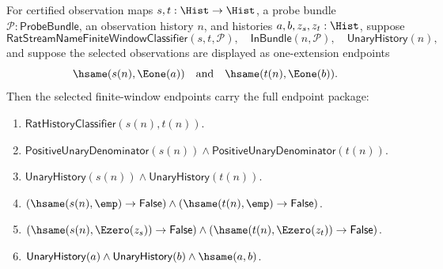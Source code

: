 \begin{theorem}
\label{thm:rat-stream-name-finite-window-selected-full-endpoint-package}
For certified observation maps $s,t:\Hist\to\Hist$, a probe bundle
$\mathcal{P}:\mathsf{ProbeBundle}$, an observation history $n$, and histories
$a,b,z_s,z_t:\Hist$, suppose
$$
\mathsf{RatStreamNameFiniteWindowClassifier}(s,t,\mathcal{P}),
\quad
\mathsf{InBundle}(n,\mathcal{P}),
\quad
\mathsf{UnaryHistory}(n),
$$
and suppose the selected observations are displayed as one-extension endpoints
$$
\hsame(s(n),\Eone(a))\quad\text{and}\quad \hsame(t(n),\Eone(b)).
$$
Then the selected finite-window endpoints carry the full endpoint package:
\begin{enumerate}
  \item $\mathsf{RatHistoryClassifier}(s(n),t(n))$.
  \item $\mathsf{PositiveUnaryDenominator}(s(n))\land
  \mathsf{PositiveUnaryDenominator}(t(n))$.
  \item $\mathsf{UnaryHistory}(s(n))\land\mathsf{UnaryHistory}(t(n))$.
  \item $(\hsame(s(n),\emp)\to\mathsf{False})\land
  (\hsame(t(n),\emp)\to\mathsf{False})$.
  \item $(\hsame(s(n),\Ezero(z_s))\to\mathsf{False})\land
  (\hsame(t(n),\Ezero(z_t))\to\mathsf{False})$.
  \item $\mathsf{UnaryHistory}(a)\land\mathsf{UnaryHistory}(b)\land
  \hsame(a,b)$.
\end{enumerate}
\end{theorem}
